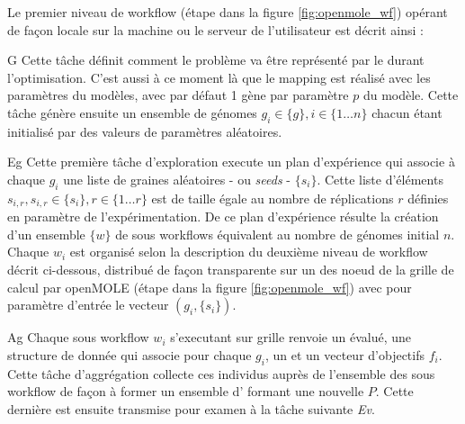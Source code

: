 Le premier niveau de workflow (étape  dans la figure \ref{fig:openmole_wf}) opérant de façon locale sur la machine ou le serveur de l'utilisateur est décrit ainsi : 


\begin{myitemize}

\item[G] Cette tâche définit comment le problème va être représenté par le  durant l'optimisation. C'est aussi à ce moment là que le mapping est réalisé avec les paramètres du modèles, avec par défaut 1 gène par paramètre $p$ du modèle. Cette tâche génère ensuite un ensemble de génomes $g_i \in \{g\}, i \in \{1 \dotsc n\}$ chacun étant initialisé par des valeurs de paramètres aléatoires.

\item[Eg] Cette première tâche d'exploration execute un plan d'expérience qui associe à chaque  $g_i$ une liste de graines aléatoires  - ou \textit{seeds} - $\{s_i\}$. Cette liste d'éléments $s_{i,r} , s_{i,r} \in \{s_i\}, r \in \{1 \dotsc r\}$ est de taille égale au nombre de réplications $r$ définies en paramètre de l'expérimentation. De ce plan d'expérience résulte la création d'un ensemble $\{w\}$ de sous workflows équivalent au nombre de génomes initial $n$. Chaque $w_i$ est organisé selon la description du deuxième niveau de workflow décrit ci-dessous, distribué de façon transparente sur un des noeud de la grille de calcul par openMOLE (étape  dans la figure \ref{fig:openmole_wf}) avec pour paramètre d'entrée le vecteur $(g_i, \{s_i\})$.

\item[Ag] Chaque sous workflow $w_i$ s'executant sur grille renvoie un  évalué, une structure de donnée qui associe pour chaque  $g_i$, un  et un vecteur d'objectifs $f_i$. Cette tâche d'aggrégation collecte ces individus auprès de l'ensemble des sous workflow de façon à former un ensemble d' formant une nouvelle  $P$. Cette dernière est ensuite transmise pour examen à la tâche suivante \textit{Ev}.


\end{myitemize}
